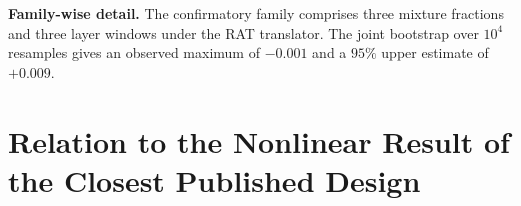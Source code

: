 \documentclass[10pt]{article}
\begin{document}
\begin{table}[h]
\centering
\caption{Teacher-content probes on the primary pair, $n{=}30$. The gold column
is the gold-letter probability of the mixture; CHG is against the student's own
prefill. The first row is the student's own cache. Both translators agree that
every probe degrades or is neutral, and that replacing the top third of layers
is neutral.}
\label{tab:probes}
\end{table}

\textbf{Family-wise detail.} The confirmatory family comprises three mixture
fractions and three layer windows under the RAT translator. The joint bootstrap
over $10^4$ resamples gives an observed maximum of $-0.001$ and a $95\%$ upper
estimate of $+0.009$.

\section{Relation to the Nonlinear Result of the Closest Published Design}
\label{app:heo-mlp}
\end{document}
